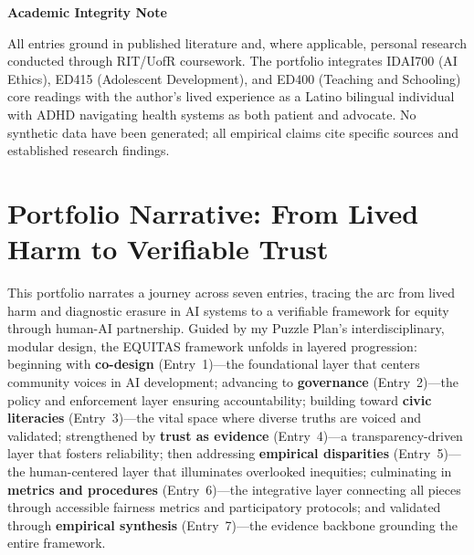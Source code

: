 \documentclass[11pt,twoside]{article}
\begin{document}
\vspace{1cm}

\noindent \textbf{\large Academic Integrity Note}

\noindent All entries ground in published literature and, where applicable, personal research conducted through RIT/UofR coursework. The portfolio integrates IDAI700 (AI Ethics), ED415 (Adolescent Development), and ED400 (Teaching and Schooling) core readings with the author's lived experience as a Latino bilingual individual with ADHD navigating health systems as both patient and advocate. No synthetic data have been generated; all empirical claims cite specific sources and established research findings.

\newpage


\setcounter{page}{7}

\section*{\label{sec:overview}Portfolio Narrative: From Lived Harm to Verifiable Trust}

\noindent This portfolio narrates a journey across seven entries, tracing the arc from lived harm and diagnostic erasure in AI systems to a verifiable framework for equity through human-AI partnership. Guided by my Puzzle Plan's interdisciplinary, modular design, the EQUITAS framework unfolds in layered progression: beginning with \textbf{co-design} (Entry~1)---the foundational layer that centers community voices in AI development; advancing to \textbf{governance} (Entry~2)---the policy and enforcement layer ensuring accountability; building toward \textbf{civic literacies} (Entry~3)---the vital space where diverse truths are voiced and validated; strengthened by \textbf{trust as evidence} (Entry~4)---a transparency-driven layer that fosters reliability; then addressing \textbf{empirical disparities} (Entry~5)---the human-centered layer that illuminates overlooked inequities; culminating in \textbf{metrics and procedures} (Entry~6)---the integrative layer connecting all pieces through accessible fairness metrics and participatory protocols; and validated through \textbf{empirical synthesis} (Entry~7)---the evidence backbone grounding the entire framework.


\vspace{0.2cm}
\end{document}
